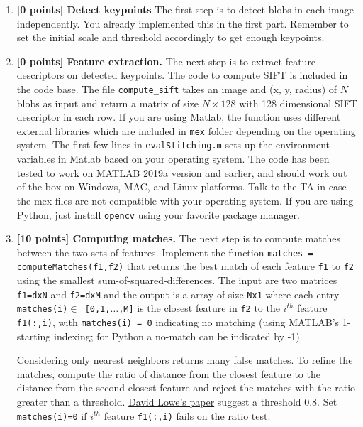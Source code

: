 \documentclass[10pt,letterpaper]{article}
\newcommand{\cmd}[1] {{\color{blue}\texttt{#1}}}
\begin{document}
\begin{enumerate}

\item \textbf{[0 points] Detect keypoints} The first step is to detect blobs in each image independently. You already implemented this in the first part. Remember to set the initial scale and threshold accordingly to get enough keypoints.
      
\item \textbf{[0 points] Feature extraction.} The next step is to extract feature descriptors on detected keypoints. The code to compute SIFT is included in the code base. The file \cmd{compute\_sift} takes an image and (x, y, radius) of $N$ blobs as input and return a matrix of size $N \times 128$ with 128 dimensional SIFT descriptor in each row. If you are using Matlab, the function uses different external libraries which are included in \cmd{mex} folder depending on the operating system. The first few lines in \cmd{evalStitching.m} sets up the environment variables in Matlab based on your operating system. The code has been tested to work on MATLAB 2019a version and earlier, and should work out of the box on Windows, MAC, and Linux platforms. Talk to the TA in case the mex files are not compatible with your operating system. If you are using Python, just install \cmd{opencv} using your favorite package manager.

\item \textbf{[10 points] Computing matches.} The next step is to compute matches between the two sets of features. Implement the function \cmd{matches = computeMatches(f1,f2)} that returns the best match of each feature \cmd{f1} to \cmd{f2} using the smallest sum-of-squared-differences. The input are two matrices \cmd{f1=dxN} and \cmd{f2=dxM} and the output is a array of size \cmd{Nx1} where each entry \cmd{matches(i)$\in$ [0,1,$\dots$,M]} is the closest feature in \cmd{f2} to the $i^{th}$ feature \cmd{f1(:,i)}, with \cmd{matches(i) = 0} indicating no matching (using MATLAB's 1-starting indexing; for Python a no-match can be indicated by -1).

Considering only nearest neighbors returns many false matches. To refine the matches, compute the ratio of distance from the closest feature to the distance from the second closest feature and reject the matches with the ratio greater than a threshold. \href{http://www.cs.ubc.ca/~lowe/papers/ijcv04.pdf}{David Lowe's paper} suggest a threshold 0.8. Set \cmd{matches(i)=0} if $i^{th}$ feature \cmd{f1(:,i)} fails on the ratio test.


\end{enumerate}
\end{document}
